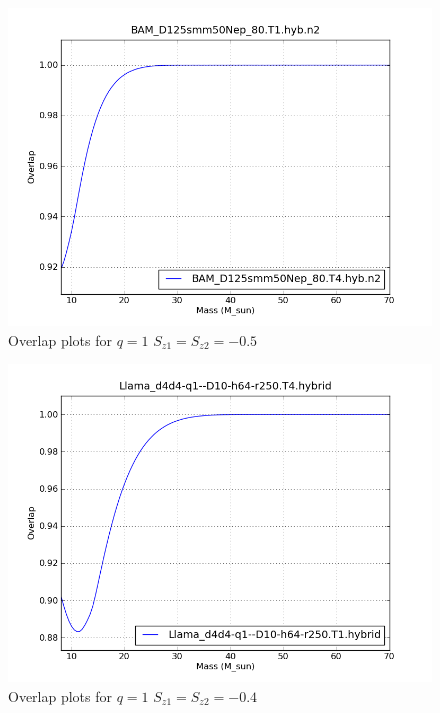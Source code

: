 \begin{figure}
  \includegraphics[width=\linewidth]{figures/ninja2/figure_1_-0d5_01.png}
  \caption[Overlap plots for $q=1$ $S_{z1} = S_{z2} = -0.5$]{
  \label{f:figure_1_-0d5}
Overlap plots for $q=1$ $S_{z1} = S_{z2} = -0.5$}
\end{figure}%


\begin{figure}
  \includegraphics[width=\linewidth]{figures/ninja2/figure_1_-0d4_01.png}
  \caption[Overlap plots for $q=1$ $S_{z1} = S_{z2} = -0.4$]{
  \label{f:figure_1_-0d4}
Overlap plots for $q=1$ $S_{z1} = S_{z2} = -0.4$}
\end{figure}%


